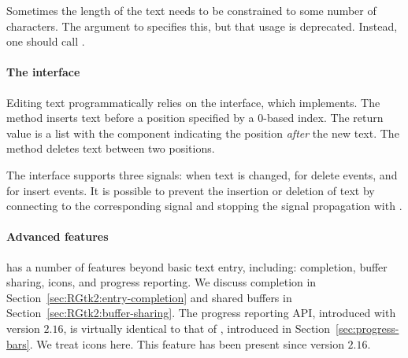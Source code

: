 Sometimes the length of the text needs to be constrained to some
number of characters. The  argument to
 specifies this, but that usage is
deprecated. Instead, one should call .

\paragraph{The  interface}

Editing text programmatically relies on the 
interface, which  implements. The method
 inserts text before a position
specified by a $0$-based index. The return value is a list with the
component  indicating the position \textit{after} the
new text. The  method deletes text
between two positions.


The  interface supports three signals:
 when text is changed,  for delete
events, and  for insert events. It is possible to
prevent the insertion or deletion of text by connecting to the
corresponding signal and stopping the signal propagation with
. 

\paragraph{Advanced  features}

 has a number of features beyond basic text entry,
including: completion, buffer sharing, icons, and progress
reporting. We discuss completion in
Section~\ref{sec:RGtk2:entry-completion} and shared buffers in
Section~\ref{sec:RGtk2:buffer-sharing}. The progress reporting API,
introduced with version $2.16$, is virtually identical to that of
, introduced in
Section~\ref{sec:progress-bars}. We treat icons here. This feature has
been present since version $2.16$.

